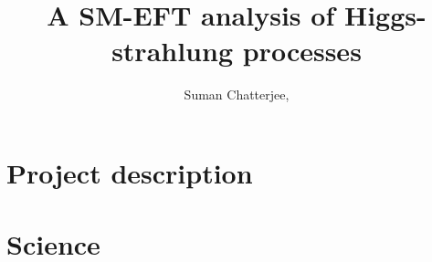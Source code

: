 \documentclass[a4paper,11pt]{article}
\begin{document}
\title{A SM-EFT analysis of Higgs-strahlung processes}

\author[a]{Suman Chatterjee,}



\section*{Project description}

\tableofcontents

\newpage

\section{Science}\label{sec:sciience}
\end{document}
